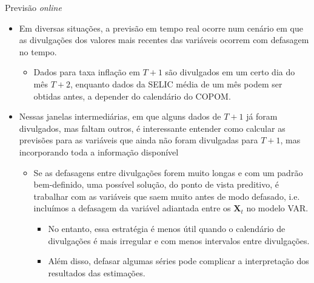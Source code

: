 \documentclass[11pt]{beamer}
\begin{document}
\begin{frame}{Previsão \textit{online}}
\begin{itemize}
	\item Em diversas situações, a previsão em tempo real ocorre num cenário em que as divulgações dos valores mais recentes das variáveis ocorrem com defasagem no tempo.
	\begin{itemize}
		\item Dados para taxa inflação em $T+1$ são divulgados em um certo dia do mês $T+2$, enquanto dados da SELIC média de um mês podem ser obtidas antes, a depender do calendário do COPOM.
	\end{itemize}
	\item Nessas janelas intermediárias, em que alguns dados de $T+1$ já foram divulgados, mas faltam outros, é interessante entender como calcular as previsões para as variáveis que ainda não foram divulgadas para $T+1$, mas incorporando {\color{blue}toda} a informação disponível
	\begin{itemize}
		\item Se as defasagens entre divulgações forem muito longas e com um padrão bem-definido, uma possível solução, do ponto de vista preditivo, é trabalhar com as variáveis que saem muito antes de modo defasado, i.e. incluímos a defasagem da variável adiantada entre os $\boldsymbol{X}_t$ no modelo VAR. 
	\begin{itemize}
		\item No entanto, essa estratégia é menos útil quando o calendário de divulgações é mais irregular e com menos intervalos entre divulgações.
		\item Além disso, defasar algumas séries pode complicar a interpretação dos resultados das estimações.
	\end{itemize}
\end{itemize}
\end{itemize}
\end{frame}
\end{document}

